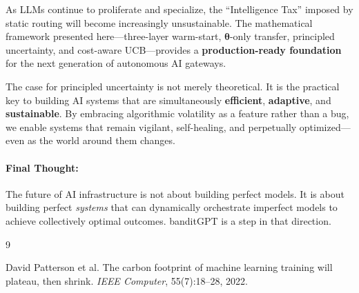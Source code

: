 \documentclass[sigconf]{acmart}
\begin{document}
As LLMs continue to proliferate and specialize, the ``Intelligence Tax'' imposed by static routing will become increasingly unsustainable. The mathematical framework presented here---three-layer warm-start, $\boldsymbol{\theta}$-only transfer, principled uncertainty, and cost-aware UCB---provides a \textbf{production-ready foundation} for the next generation of autonomous AI gateways.

The case for principled uncertainty is not merely theoretical. It is the practical key to building AI systems that are simultaneously \textbf{efficient}, \textbf{adaptive}, and \textbf{sustainable}. By embracing algorithmic volatility as a feature rather than a bug, we enable systems that remain vigilant, self-healing, and perpetually optimized---even as the world around them changes.

\paragraph{Final Thought:}
The future of AI infrastructure is not about building perfect models. It is about building perfect \emph{systems} that can dynamically orchestrate imperfect models to achieve collectively optimal outcomes. banditGPT is a step in that direction.


\begin{thebibliography}{9}

David Patterson et al.
\newblock The carbon footprint of machine learning training will plateau, then shrink.
\newblock \emph{IEEE Computer}, 55(7):18--28, 2022.

\end{thebibliography}
\end{document}
